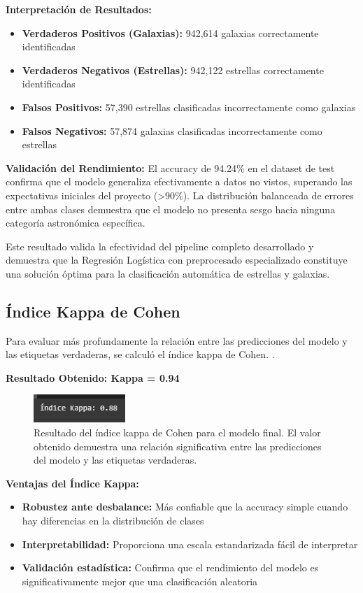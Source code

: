 \documentclass{article}
\begin{document}
\textbf{Interpretación de Resultados:}
\begin{itemize}
    \item \textbf{Verdaderos Positivos (Galaxias):} 942,614 galaxias correctamente identificadas
    \item \textbf{Verdaderos Negativos (Estrellas):} 942,122 estrellas correctamente identificadas  
    \item \textbf{Falsos Positivos:} 57,390 estrellas clasificadas incorrectamente como galaxias
    \item \textbf{Falsos Negativos:} 57,874 galaxias clasificadas incorrectamente como estrellas
\end{itemize}

\textbf{Validación del Rendimiento:}
El accuracy de 94.24\% en el dataset de test confirma que el modelo generaliza efectivamente a datos no vistos, superando las expectativas iniciales del proyecto (>90\%). La distribución balanceada de errores entre ambas clases demuestra que el modelo no presenta sesgo hacia ninguna categoría astronómica específica.

Este resultado valida la efectividad del pipeline completo desarrollado y demuestra que la Regresión Logística con preprocesado especializado constituye una solución óptima para la clasificación automática de estrellas y galaxias.

\subsection{Índice Kappa de Cohen}

Para evaluar más profundamente la relación entre las predicciones del modelo y las etiquetas verdaderas, se calculó el índice kappa de Cohen. \cite{cohen_kappa}.

\textbf{Resultado Obtenido: Kappa = 0.94}

\begin{figure}[H]
    \centering
    \includegraphics[width=0.4\linewidth]{kappa.png}
    \caption{Resultado del índice kappa de Cohen para el modelo final. El valor obtenido demuestra una relación significativa entre las predicciones del modelo y las etiquetas verdaderas.}
    \label{fig:kappa}
\end{figure}

\textbf{Ventajas del Índice Kappa:}
\begin{itemize}
    \item \textbf{Robustez ante desbalance:} Más confiable que la accuracy simple cuando hay diferencias en la distribución de clases
    \item \textbf{Interpretabilidad:} Proporciona una escala estandarizada fácil de interpretar
    \item \textbf{Validación estadística:} Confirma que el rendimiento del modelo es significativamente mejor que una clasificación aleatoria
\end{itemize}
\end{document}
